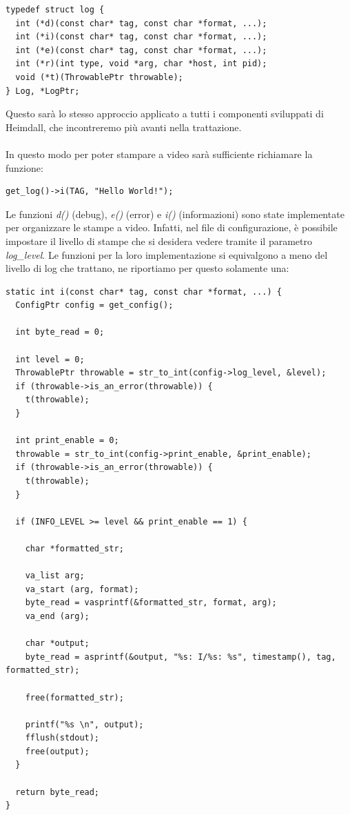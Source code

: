 \documentclass[italian]{tktltiki2}
\begin{document}
\begin{lstlisting}
typedef struct log {
  int (*d)(const char* tag, const char *format, ...);
  int (*i)(const char* tag, const char *format, ...);
  int (*e)(const char* tag, const char *format, ...);
  int (*r)(int type, void *arg, char *host, int pid);
  void (*t)(ThrowablePtr throwable);
} Log, *LogPtr;
\end{lstlisting}
Questo sarà lo stesso approccio applicato a tutti i componenti sviluppati di Heimdall, che incontreremo più avanti nella trattazione.
\\\\
In questo modo per poter stampare a video sarà sufficiente richiamare la funzione:
\begin{lstlisting}
get_log()->i(TAG, "Hello World!");
\end{lstlisting}
Le funzioni \emph{d()} (debug), \emph{e()} (error) e \emph{i()} (informazioni) sono state implementate per organizzare le stampe a video. Infatti, nel file di configurazione, è possibile impostare il livello di stampe che si desidera vedere tramite il parametro \emph{log\_level}. Le funzioni per la loro implementazione si equivalgono a meno del livello di log che trattano, ne riportiamo per questo solamente una:
\begin{lstlisting}
static int i(const char* tag, const char *format, ...) {
  ConfigPtr config = get_config();

  int byte_read = 0;

  int level = 0;
  ThrowablePtr throwable = str_to_int(config->log_level, &level);
  if (throwable->is_an_error(throwable)) {
    t(throwable);
  }

  int print_enable = 0;
  throwable = str_to_int(config->print_enable, &print_enable);
  if (throwable->is_an_error(throwable)) {
    t(throwable);
  }

  if (INFO_LEVEL >= level && print_enable == 1) {

    char *formatted_str;

    va_list arg;
    va_start (arg, format);
    byte_read = vasprintf(&formatted_str, format, arg);
    va_end (arg);

    char *output;
    byte_read = asprintf(&output, "%s: I/%s: %s", timestamp(), tag, formatted_str);

    free(formatted_str);

    printf("%s \n", output);
    fflush(stdout);
    free(output);
  }

  return byte_read;
}
\end{lstlisting}
\end{document}

